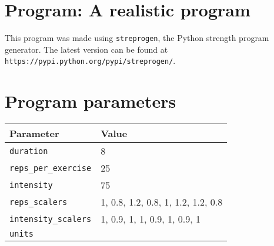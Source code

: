 \documentclass[12pt, a4paper]{article}%
\begin{document}
\large

\section*{Program: A realistic program}

This program was made using \verb|streprogen|,
the Python strength program generator.
The latest version can be found at \\
\verb|https://pypi.python.org/pypi/streprogen/|.


\section*{Program parameters}
\begin{tabular}{l|l}
	\textbf{Parameter} & \textbf{Value} \\ \hline
	\verb|duration|             & 8 \\
	\verb|reps_per_exercise|    & 25 \\
	\verb|intensity|        & 75 \\
	\verb|reps_scalers|         & 1, 0.8, 1.2, 0.8, 1, 1.2, 1.2, 0.8 \\
	\verb|intensity_scalers|    & 1, 0.9, 1, 1, 0.9, 1, 0.9, 1 \\
	\verb|units|                & 
\end{tabular}
\end{document}
